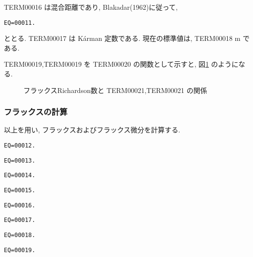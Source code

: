 TERM00016 は混合距離であり, Blakadar(1962)に従って,
\begin{verbatim}
EQ=00011.
\end{verbatim}
ととる. 
TERM00017 は K\'{a}rman 定数である. 
%
% 
現在の標準値は, TERM00018 m である.

TERM00019,TERM00019 を TERM00020 の関数として示すと,
図\ref{p-dif:smsh-rif} のようになる.

\begin{figure}[htbp]
  \begin{center}
    \caption{フラックスRichardson数と TERM00021,TERM00021 の関係}
    \label{p-dif:smsh-rif}
  \end{center}
\end{figure}


\subsubsection{フラックスの計算}

以上を用い, フラックスおよびフラックス微分を計算する.

\begin{verbatim}
EQ=00012.
\end{verbatim}
\begin{verbatim}
EQ=00013.
\end{verbatim}
\begin{verbatim}
EQ=00014.
\end{verbatim}
\begin{verbatim}
EQ=00015.
\end{verbatim}

\begin{verbatim}
EQ=00016.
\end{verbatim}
\begin{verbatim}
EQ=00017.
\end{verbatim}
\begin{verbatim}
EQ=00018.
\end{verbatim}
\begin{verbatim}
EQ=00019.
\end{verbatim}

